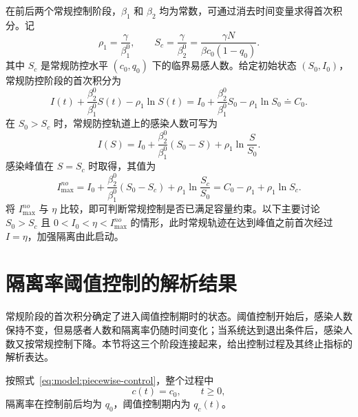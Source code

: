 \documentclass[lang=cn,a4paper,newtx]{elegantpaper}
\numberwithin{equation}{section}
\theoremstyle{plain}
\begin{document}
在前后两个常规控制阶段，$\beta_1$ 和 $\beta_2$ 均为常数，可通过消去时间变量求得首次积分。记
\begin{equation}
\rho_1=\frac{\gamma}{\beta_1^0},
\qquad
S_c=\frac{\gamma}{\beta_2^0}
=\frac{\gamma N}{\beta c_0(1-q_0)}.
\label{eq:model:baseline-symbols}
\end{equation}
其中 $S_c$ 是常规防控水平 $(c_0,q_0)$ 下的临界易感人数。给定初始状态 $(S_0,I_0)$，常规防控阶段的首次积分为
\begin{equation}
I(t)+\frac{\beta_2^0}{\beta_1^0} S(t)-\rho_1\ln S(t)
=
I_0+\frac{\beta_2^0}{\beta_1^0} S_0-\rho_1\ln S_0
\doteq C_0.
\label{eq:model:first-integral}
\end{equation}
在 $S_0>S_c$ 时，常规防控轨道上的感染人数可写为
\begin{equation*}
I(S)=I_0+\frac{\beta_2^0}{\beta_1^0}(S_0-S)
+\rho_1\ln\frac{S}{S_0}.
\end{equation*}
感染峰值在 $S=S_c$ 时取得，其值为
\begin{equation}
I_{\max}^{no}
=
I_0+\frac{\beta_2^0}{\beta_1^0}(S_0-S_c)
+\rho_1\ln\frac{S_c}{S_0}=C_0-\rho_1+\rho_1\ln S_c.
\label{eq:s1:Imax-no}
\end{equation}
将 $I_{\max}^{no}$ 与 $\eta$ 比较，即可判断常规控制是否已满足容量约束。以下主要讨论 $S_0>S_c$ 且 $0<I_0<\eta<I_{\max}^{no}$ 的情形，此时常规轨迹在达到峰值之前首次经过 $I=\eta$，加强隔离由此启动。

\section{隔离率阈值控制的解析结果}
\label{sec:s1}
常规阶段的首次积分确定了进入阈值控制期时的状态。阈值控制开始后，感染人数保持不变，但易感者人数和隔离率仍随时间变化；当系统达到退出条件后，感染人数又按常规控制下降。本节将这三个阶段连接起来，给出控制过程及其终止指标的解析表达。

按照式~\eqref{eq:model:piecewise-control}，整个过程中
\begin{equation*}
c(t)=c_0,\qquad t\ge 0,
\end{equation*}
隔离率在控制前后均为 $q_0$，阈值控制期内为 $q_c(t)$。
\end{document}
